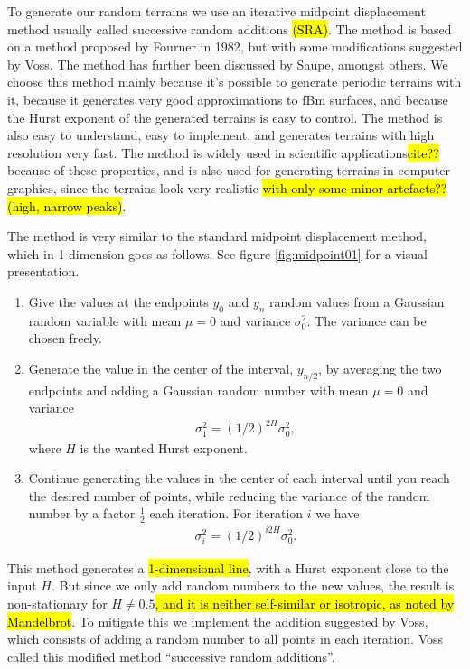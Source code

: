 To generate our random terrains we use an iterative midpoint displacement method usually called successive random additions \hl{(SRA)}. The method is based on a method proposed by Fourner in 1982\cite{fournier1982computer}, but with some modifications suggested by Voss\cite{voss1985random, voss1988fractals}. The method has further been discussed by Saupe\cite{saupe1988algorithms}, amongst others. We choose this method mainly because it's possible to generate periodic terrains with it, because it generates very good approximations to fBm surfaces\cite{zhou2005comparison}, and because the Hurst exponent of the generated terrains is easy to control. The method is also easy to understand, easy to implement, and generates terrains with high resolution very fast. The method is widely used in scientific applications\hl{cite??} because of these properties, and is also used for generating terrains in computer graphics, since the terrains look very realistic \hl{with only some minor artefacts?? (high, narrow peaks)}.

The method is very similar to the standard midpoint displacement method, which in 1 dimension goes as follows. See figure \ref{fig:midpoint01} for a visual presentation.
\begin{enumerate}
    \item Give the values at the endpoints $y_0$ and $y_n$ random values from a Gaussian random variable with mean $\mu = 0$ and variance $\sigma_0^2$. The variance can be chosen freely.
    \item Generate the value in the center of the interval, $y_{n/2}$, by averaging the two endpoints and adding a Gaussian random number with mean $\mu = 0$ and variance
    \begin{align*}
         \sigma_1^2 = \left(1/2\right)^{2H}\sigma_0^2,
    \end{align*}
    where $H$ is the wanted Hurst exponent.
    \item Continue generating the values in the center of each interval until you reach the desired number of points, while reducing the variance of the random number by a factor $\frac{1}{2}$ each iteration. For iteration $i$ we have
    \begin{align*}
        \sigma_i^2 = \left(1/2\right)^{i2H}\sigma_0^2.
    \end{align*}
\end{enumerate}
This method generates a \hl{1-dimensional line}, with a Hurst exponent close to the input $H$. But since we only add random numbers to the new values, the result is non-stationary for $H \neq 0.5$\cite{voss1985random}\hl{, and it is neither self-similar or isotropic, as noted by Mandelbrot}\cite{mandelbrot1982comment}. To mitigate this we implement the addition suggested by Voss\cite{voss1985random}, which consists of adding a random number to all points in each iteration. Voss called this modified method ``successive random additions''.

